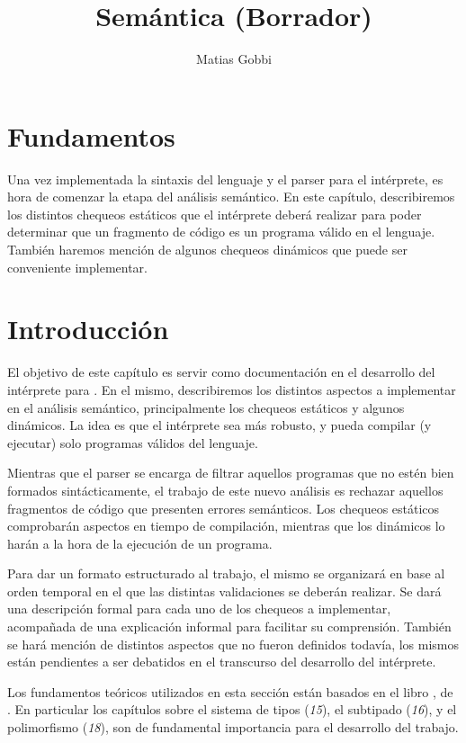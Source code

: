 \documentclass{article}
\begin{document}
\title{Semántica (Borrador)}
\author{Matias Gobbi}
\maketitle

\section*{Fundamentos}

Una vez implementada la sintaxis del lenguaje y el parser para el intérprete, es hora de comenzar la etapa del análisis semántico.
En este capítulo, describiremos los distintos chequeos estáticos que el intérprete deberá realizar para poder determinar que un fragmento de código es un programa válido en el lenguaje.
También haremos mención de algunos chequeos dinámicos que puede ser conveniente implementar.

\section{Introducción}

El objetivo de este capítulo es servir como documentación en el desarrollo del intérprete para \Lenguaje.
En el mismo, describiremos los distintos aspectos a implementar en el análisis semántico, principalmente los chequeos estáticos y algunos dinámicos.
La idea es que el intérprete sea más robusto, y pueda compilar (y ejecutar) solo programas válidos del lenguaje.

Mientras que el parser se encarga de filtrar aquellos programas que no estén bien formados sintácticamente, el trabajo de este nuevo análisis es rechazar aquellos fragmentos de código que presenten errores semánticos.
Los chequeos estáticos comprobarán aspectos en tiempo de compilación, mientras que los dinámicos lo harán a la hora de la ejecución de un programa.

Para dar un formato estructurado al trabajo, el mismo se organizará en base al orden temporal en el que las distintas validaciones se deberán realizar.
Se dará una descripción formal para cada uno de los chequeos a implementar, acompañada de una explicación informal para facilitar su comprensión.
También se hará mención de distintos aspectos que no fueron definidos todavía, los mismos están pendientes a ser debatidos en el transcurso del desarrollo del intérprete.

Los fundamentos teóricos utilizados en esta sección están basados en el libro \Libro, de \Autor.
En particular los capítulos sobre el sistema de tipos (\textit{15}), el subtipado (\textit{16}), y el polimorfismo (\textit{18}), son de fundamental importancia para el desarrollo del trabajo.
\end{document}
